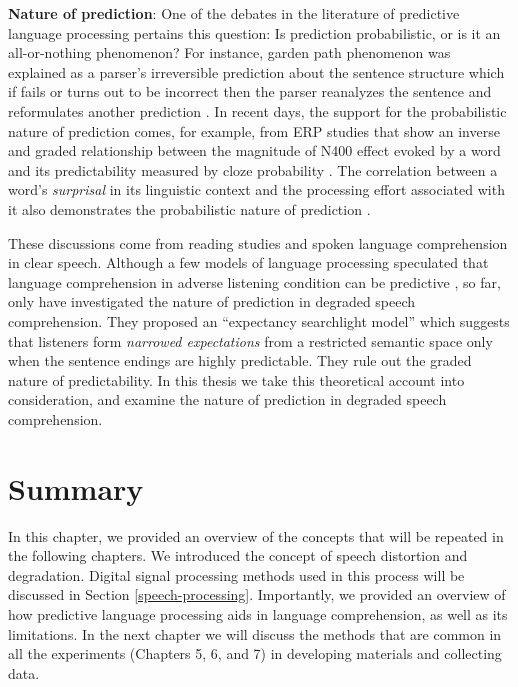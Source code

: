 \documentclass[a4paper, nobind]{templates/ociamthesis}
\begin{document}
\textbf{Nature of prediction}:
One of the debates in the literature of predictive language processing pertains this question: Is prediction probabilistic, or is it an all-or-nothing phenomenon?
For instance, garden path phenomenon was explained as a parser's irreversible prediction about the sentence structure
which if fails or turns out to be incorrect then the parser reanalyzes the sentence and reformulates another prediction \autocites[e.g.,][]{Ferreira1986}[see also,][]{Slattery2013}.
In recent days, the support for the probabilistic nature of prediction comes, for example, from ERP studies that show an inverse and graded relationship between the magnitude of N400 effect evoked by a word and its predictability measured by cloze probability \autocite[e.g.,][]{Delong2005}.
The correlation between a word's \emph{surprisal} in its linguistic context and the processing effort associated with it also demonstrates the probabilistic nature of prediction \autocites[e.g.,][]{Hale2001,Smith2008}.

These discussions come from reading studies and spoken language comprehension in clear speech.
Although a few models of language processing speculated that language comprehension in adverse listening condition can be predictive \autocites[e.g.,][]{Lowder2016,Ryskin2018},
so far, only \textcite{Strauss2013} have investigated the nature of prediction in degraded speech comprehension.
They proposed an ``expectancy searchlight model'' which suggests that listeners form \emph{narrowed expectations} from a restricted semantic space only when the sentence endings are highly predictable.
They rule out the graded nature of predictability.
In this thesis we take this theoretical account into consideration,
and examine the nature of prediction in degraded speech comprehension.

\hypertarget{summary}{%
\section{Summary}\label{summary}}

In this chapter, we provided an overview of the concepts that will be repeated in the following chapters.
We introduced the concept of speech distortion and degradation.
Digital signal processing methods used in this process will be discussed in Section \ref{speech-processing}.
Importantly, we provided an overview of how predictive language processing aids in language comprehension,
as well as its limitations.
In the next chapter we will discuss the methods that are common in all the experiments (Chapters 5, 6, and 7) in developing materials and collecting data.
\end{document}
